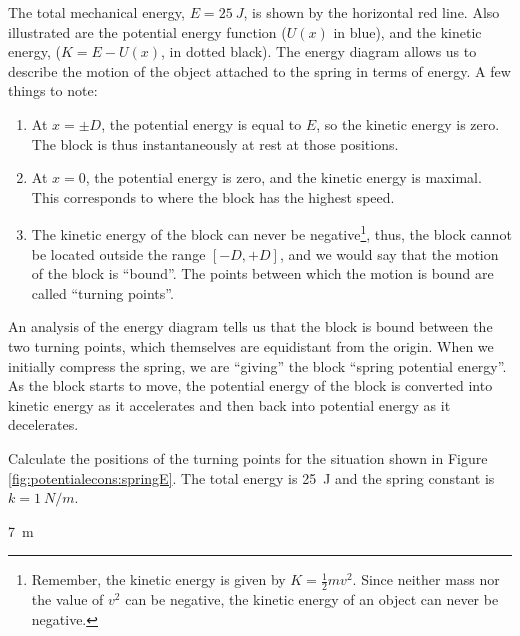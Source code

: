 The total mechanical energy, $E=\SI{25}{J}$, is shown by the horizontal red line. Also illustrated are the potential energy function ($U(x)$ in blue), and the kinetic energy, ($K=E-U(x)$, in dotted black).
The energy diagram allows us to describe the motion of the object attached to the spring in terms of energy. A few things to note:
\begin{enumerate}
\item At $x=\pm D$, the potential energy is equal to $E$, so the kinetic energy is zero. The block is thus instantaneously at rest at those positions.
\item At $x=0$, the potential energy is zero, and the kinetic energy is maximal. This corresponds to where the block has the highest speed. 
\item The kinetic energy of the block can never be negative\footnote{Remember, the kinetic energy is given by $K=\frac{1}{2}mv^2$. Since neither mass nor the value of $v^2$ can be negative, the kinetic energy of an object can never be negative.}, thus, the block cannot be located outside the range $[-D,+D]$, and we would say that the motion of the block is ``bound''. The points between which the motion is bound are called ``turning points''.
\end{enumerate}
An analysis of the energy diagram tells us that the block is bound between the two turning points, which themselves are equidistant from the origin. When we initially compress the spring, we are ``giving'' the block ``spring potential energy''. As the block starts to move, the potential energy of the block is converted into kinetic energy as it accelerates and then back into potential energy as it decelerates.

\begin{checkpoint}
Calculate the positions of the turning points for the situation shown in Figure \ref{fig:potentialecons:springE}. The total energy is \SI{25}{J} and the spring constant is $k=\SI{1}{N/m}$.
\begin{answer}
\SI{7}{m}
\end{answer}
\end{checkpoint}

